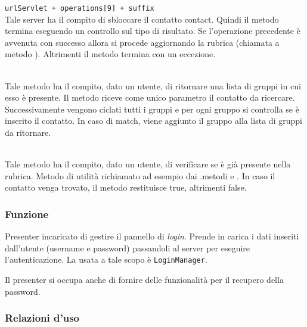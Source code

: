 \begin{description}
\verb|urlServlet + operations[9] + suffix|\\

Tale server ha il compito di sbloccare il contatto contact. Quindi il metodo termina eseguendo un controllo sul tipo di risultato. Se l'operazione precedente è avvenuta con successo allora si procede aggiornando la rubrica (chiamata a metodo ). Altrimenti il metodo termina con un eccezione.

\item{}\\
Tale metodo ha il compito, dato un utente, di ritornare una lista di gruppi in cui esso è presente. Il metodo riceve come unico parametro il contatto da ricercare. Successivamente vengono ciclati tutti i gruppi e per ogni gruppo si controlla se è inserito il contatto. In caso di match, viene aggiunto il gruppo alla lista di gruppi da ritornare.

\item{}\\
Tale metodo ha il compito, dato un utente, di verificare se è già presente nella rubrica. Metodo di utilità richiamato ad esempio dai .metodi  e . In caso il contatto venga trovato, il metodo restituisce true, altrimenti false.


\end{description}


\subsubsection*{Funzione}
Presenter incaricato di gestire il pannello di \textit{login}. Prende in carica i dati inseriti dall'utente (username e password) passandoli al server per eseguire l'autenticazione. La  usata a tale scopo è \texttt{LoginManager}.

Il presenter si occupa anche di fornire delle funzionalità per il recupero della password.

\subsubsection*{Relazioni d'uso}


